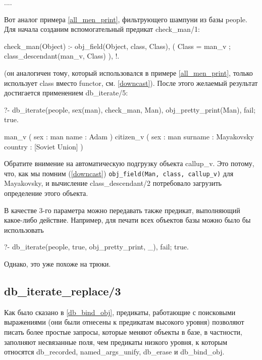 \documentclass[a4paper]{book}
\def\na{named_args_unify}
\begin{document}
....

Вот аналог примера \ref{all_men_print}, фильтрующего шампуни из
базы people. Для начала созданим вспомогательный предикат
check_man/1:

\begin{example}{}{}
check_man(Object) :- obj_field(Object, class, Class), 
   ( Class = man_v 
   ; class_descendant(man_v, Class)
   ), !.
\end{example}

(он аналогичен тому, который использовался в примере
\ref{all_men_print}, только использует class вместо functor,
см. \ref{downcast}). После этого желаемый результат достигается
применением db_iterate/5:

\begin{example}{}{}
?- db_iterate(people, sex(man), check_man, Man), 
   obj_pretty_print(Man), fail; true.

man_v ( 
  sex : man 
  name : Adam 
) 
citizen_v ( 
  sex : man 
  surname : Mayakovsky 
  country : [Soviet Union] 
) 
\end{example}

Обратите внимение на автоматическую подгрузку объекта
callup_v. Это потому, что, как мы помним (\ref{downcast})
\verb|obj_field(Man, class, callup_v)| для Mayakovsky, и
вычисление class_descendant/2 потребовало загрузить определение
этого объекта.

В качестве 3-го параметра можно передавать также предикат,
выполняющий какое-либо действие. Например, для печати всех
объектов базы можно было бы использовать

\begin{example}{}{}
?- db_iterate(people, true, obj_pretty_print, _), fail; true.
\end{example}

Однако, это уже похоже на трюки.

\subsection{db_iterate_replace/3}
\label{db_iterate_replace/3}

Как было сказано в \ref{db_bind_obj}, предикаты, работающие с
поисковыми выражениями (они были отнесены к предикатам высокого
уровня) позволяют писать более простые запросы, которые меняют
объекты в базе, в частности, заполняют несвязанные поля, чем
предикаты низкого уровня, к которым относятся db_recorded, \na,
db_erase и db_bind_obj.
\end{document}
